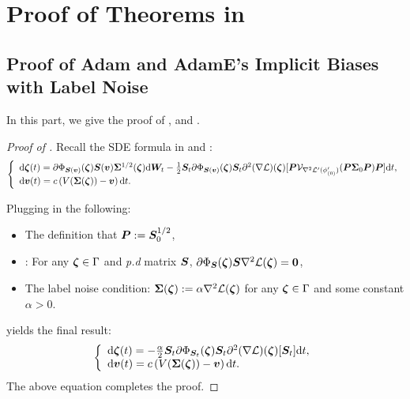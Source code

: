 \section{Proof of Theorems in }\label{proof:diag}


\subsection{Proof of Adam and AdamE's Implicit Biases with Label Noise}
In this part, we give the proof of ,  and .
\begin{proof}[Proof of ] Recall the SDE formula in  and :
    \begin{align*}
        \left\{\begin{array}{l}
             \mathrm{d} {\bm{\zeta}}(t) = \partial\Phi_{{\bm{S}}({\bm{v}})}({\bm{\zeta}}){\bm{S}}({\bm{v}}) {\bm{\Sigma}}^{1/2}({\bm{\zeta}})\mathrm{d} {\bm{W}}_t - \frac{1}{2} {\bm{S}}_t  \partial\Phi_{{\bm{S}}({\bm{v}})}({\bm{\zeta}}) {\bm{S}}_t \partial^2 (\nabla \mathcal{L})({\bm{\zeta}}) [{\bm{P}} \mathcal{V}_{\nabla^2 \mathcal{L}'(\phi'_{(0)})}({\bm{P}} {\bm{\Sigma}}_0{\bm{P}}){\bm{P}}]\mathrm{d} t, \\
             \mathrm{d} {\bm{v}}(t) = c \left(V({\bm{\Sigma}}({\bm{\zeta}})) - {\bm{v}}\right) \mathrm{d} t.
        \end{array}\right. 
    \end{align*}

Plugging in the following:
\begin{itemize}
    \item The definition that ${\bm{P}}:={\bm{S}}_0^{1/2}$,
    \item {}: For any ${\bm{\zeta}}\in\Gamma$ and \textit{p.d} matrix ${\bm{S}}$, $\partial \Phi_{{\bm{S}}}({\bm{\zeta}}){\bm{S}} \nabla^2 \mathcal{L}({\bm{\zeta}})=\boldsymbol{0}$,
    \item The label noise condition: ${\bm{\Sigma}}({\bm{\zeta}}) := \alpha \nabla^2 \mathcal{L}({\bm{\zeta}})$ for any ${\bm{\zeta}}\in\Gamma$ and some constant $\alpha >0$.
\end{itemize}
yields the final result:
    \begin{align}\label{AGM-slow-ode-appendix}
        \left\{\begin{array}{l}
             \mathrm{d} {\bm{\zeta}}(t) =  - \frac{\alpha}{2} {\bm{S}}_t  \partial\Phi_{{\bm{S}}_t}({\bm{\zeta}}) {\bm{S}}_t \partial^2 (\nabla \mathcal{L})({\bm{\zeta}}) [{\bm{S}}_t]\mathrm{d} t, \\
             \mathrm{d} {\bm{v}}(t) = c \left(V({\bm{\Sigma}}({\bm{\zeta}})) - {\bm{v}}\right) \mathrm{d} t.
        \end{array}\right.
    \end{align}
    The above equation completes the proof.
\end{proof}

